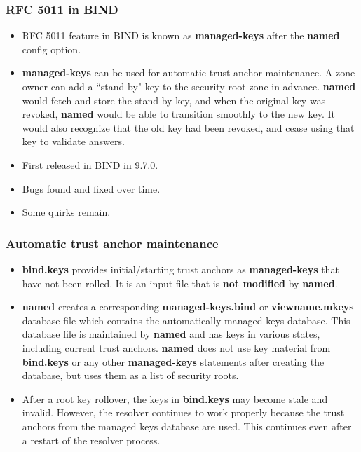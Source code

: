 \documentclass{beamer}
\begin{document}
\frame
{
  \frametitle{RFC 5011 in BIND}

  \begin{itemize}
  \item RFC 5011 feature in BIND is known as \textbf{managed-keys} after
    the \textbf{named} config option.
  \item \textbf{managed-keys} can be used for automatic trust anchor
    maintenance. A zone owner can add a ``stand-by" key to the
    security-root zone in advance. \textbf{named} would fetch and store
    the stand-by key, and when the original key was revoked,
    \textbf{named} would be able to transition smoothly to the new
    key. It would also recognize that the old key had been revoked, and
    cease using that key to validate answers.
  \item First released in BIND in 9.7.0.
  \item Bugs found and fixed over time.
  \item Some quirks remain.
  \end{itemize}
}

\frame
{
  \frametitle{Automatic trust anchor maintenance}

  \begin{itemize}

  \item \textbf{bind.keys} provides initial/starting trust anchors as
    \textbf{managed-keys} that have not been rolled. It is an input file that is
    \textbf{not modified} by \textbf{named}.

  \item \textbf{named} creates a corresponding
    \textbf{managed-keys.bind} or \textbf{viewname.mkeys} database file
    which contains the automatically managed keys database. This
    database file is maintained by \textbf{named} and has keys in
    various states, including current trust anchors. \textbf{named} does
    not use key material from \textbf{bind.keys} or any other
    \textbf{managed-keys} statements after creating the database, but
    uses them as a list of security roots.

  \item After a root key rollover, the keys in \textbf{bind.keys} may
    become stale and invalid. However, the resolver continues to work
    properly because the trust anchors from the managed keys database
    are used. This continues even after a restart of the resolver
    process.

  \end{itemize}
}
\end{document}

